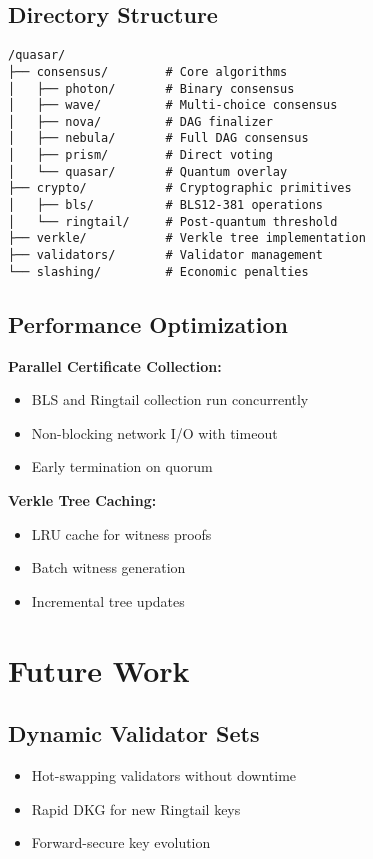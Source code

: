 \documentclass[11pt]{article}
\begin{document}
\subsection{Directory Structure}

\begin{verbatim}
/quasar/
├── consensus/        # Core algorithms
│   ├── photon/       # Binary consensus
│   ├── wave/         # Multi-choice consensus
│   ├── nova/         # DAG finalizer
│   ├── nebula/       # Full DAG consensus
│   ├── prism/        # Direct voting
│   └── quasar/       # Quantum overlay
├── crypto/           # Cryptographic primitives
│   ├── bls/          # BLS12-381 operations
│   └── ringtail/     # Post-quantum threshold
├── verkle/           # Verkle tree implementation
├── validators/       # Validator management
└── slashing/         # Economic penalties
\end{verbatim}

\subsection{Performance Optimization}

\textbf{Parallel Certificate Collection:}
\begin{itemize}
\item BLS and Ringtail collection run concurrently
\item Non-blocking network I/O with timeout
\item Early termination on quorum
\end{itemize}

\textbf{Verkle Tree Caching:}
\begin{itemize}
\item LRU cache for witness proofs
\item Batch witness generation
\item Incremental tree updates
\end{itemize}

\section{Future Work}

\subsection{Dynamic Validator Sets}
\begin{itemize}
\item Hot-swapping validators without downtime
\item Rapid DKG for new Ringtail keys
\item Forward-secure key evolution
\end{itemize}
\end{document}
